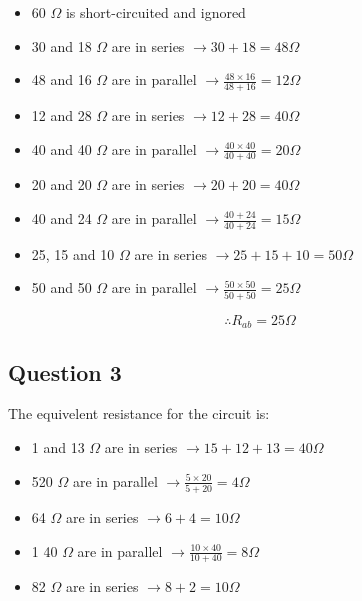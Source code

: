 \documentclass[11pt]{article}
\begin{document}
\begin{itemize}
\item 60 \(\Omega\) is short-circuited and ignored

\item 30 and 18 \(\Omega\) are in series \(\to 30 + 18 = 48 \Omega\)

\item 48 and 16 \(\Omega\) are in parallel \(\to \frac{48 \times 16}{48 + 16} = 12 \Omega\)

\item 12 and 28 \(\Omega\) are in series \(\to 12 + 28 = 40 \Omega\)

\item 40 and 40 \(\Omega\) are in parallel \(\to \frac{40 \times 40}{40 + 40} = 20 \Omega\)

\item 20 and 20 \(\Omega\) are in series \(\to 20 + 20 = 40 \Omega\)

\item 40 and 24 \(\Omega\) are in parallel \(\to \frac{40 + 24}{40 + 24} = 15 \Omega\)

\item 25, 15 and 10 \(\Omega\) are in series \(\to 25 + 15 + 10 = 50 \Omega\)

\item 50 and 50 \(\Omega\) are in parallel \(\to \frac{50 \times 50}{50 + 50} = 25 \Omega\)
\end{itemize}

$$\therefore \boxed{R_{ab} = 25 \Omega}$$
\subsection{Question 3}
\label{sec:org6239fc3}

The equivelent resistance for the circuit is:

\begin{itemize}
\item 1 and 13 \(\Omega\) are in series \(\to 15 + 12 + 13 = 40 \Omega\)

\item 520 \(\Omega\) are in parallel \(\to \frac{5 \times 20}{5 + 20} = 4 \Omega\)

\item 64 \(\Omega\) are in series \(\to 6 + 4 = 10 \Omega\)

\item 1 40 \(\Omega\) are in parallel \(\to \frac{10 \times 40}{10 + 40} = 8 \Omega\)

\item 82 \(\Omega\) are in series \(\to 8 + 2 = 10 \Omega\)
\end{itemize}
\end{document}
